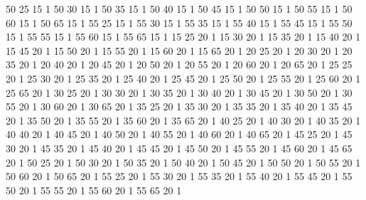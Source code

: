 	50	25	15	1
	50	30	15	1
	50	35	15	1
	50	40	15	1
	50	45	15	1
	50	50	15	1
	50	55	15	1
	50	60	15	1
	50	65	15	1
	55	25	15	1
	55	30	15	1
	55	35	15	1
	55	40	15	1
	55	45	15	1
	55	50	15	1
	55	55	15	1
	55	60	15	1
	55	65	15	1
	15	25	20	1
	15	30	20	1
	15	35	20	1
	15	40	20	1
	15	45	20	1
	15	50	20	1
	15	55	20	1
	15	60	20	1
	15	65	20	1
	20	25	20	1
	20	30	20	1
	20	35	20	1
	20	40	20	1
	20	45	20	1
	20	50	20	1
	20	55	20	1
	20	60	20	1
	20	65	20	1
	25	25	20	1
	25	30	20	1
	25	35	20	1
	25	40	20	1
	25	45	20	1
	25	50	20	1
	25	55	20	1
	25	60	20	1
	25	65	20	1
	30	25	20	1
	30	30	20	1
	30	35	20	1
	30	40	20	1
	30	45	20	1
	30	50	20	1
	30	55	20	1
	30	60	20	1
	30	65	20	1
	35	25	20	1
	35	30	20	1
	35	35	20	1
	35	40	20	1
	35	45	20	1
	35	50	20	1
	35	55	20	1
	35	60	20	1
	35	65	20	1
	40	25	20	1
	40	30	20	1
	40	35	20	1
	40	40	20	1
	40	45	20	1
	40	50	20	1
	40	55	20	1
	40	60	20	1
	40	65	20	1
	45	25	20	1
	45	30	20	1
	45	35	20	1
	45	40	20	1
	45	45	20	1
	45	50	20	1
	45	55	20	1
	45	60	20	1
	45	65	20	1
	50	25	20	1
	50	30	20	1
	50	35	20	1
	50	40	20	1
	50	45	20	1
	50	50	20	1
	50	55	20	1
	50	60	20	1
	50	65	20	1
	55	25	20	1
	55	30	20	1
	55	35	20	1
	55	40	20	1
	55	45	20	1
	55	50	20	1
	55	55	20	1
	55	60	20	1
	55	65	20	1

